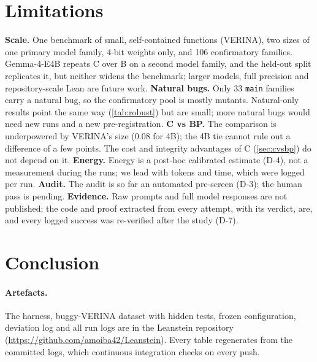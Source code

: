 \documentclass[10pt,twocolumn]{article}
\begin{document}
\section{Limitations}
\label{sec:limits}
\textbf{Scale.} One benchmark of small, self-contained functions (VERINA), two sizes of one primary model family,
4-bit weights only, and 106 confirmatory families. Gemma-4-E4B repeats C over B on a second model family, and the
held-out split replicates it, but neither widens the benchmark; larger models, full precision and
repository-scale Lean are future work.
\textbf{Natural bugs.} Only 33 \texttt{main} families carry a natural bug, so the confirmatory pool is mostly
mutants. Natural-only results point the same way (\cref{tab:robust}) but are small; more natural bugs would need
new runs and a new pre-registration.
\textbf{C vs BP.} The comparison is underpowered by VERINA's size (0.08 for 4B); the 4B tie cannot rule out a
difference of a few points. The cost and integrity advantages of C (\cref{sec:cvsbp}) do not depend on it.
\textbf{Energy.} Energy is a post-hoc calibrated estimate (D-4), not a measurement during the runs; we lead with
tokens and time, which were logged per run.
\textbf{Audit.} The audit is so far an automated pre-screen (D-3); the human pass is pending.
\textbf{Evidence.} Raw prompts and full model responses are not published; the code and proof extracted from
every attempt, with its verdict, are, and every logged success was re-verified after the study (D-7).

\section{Conclusion}
\resConclusionText

\paragraph{Artefacts.} The harness, buggy-VERINA dataset with hidden tests, frozen configuration, deviation log
and all run logs are in the Leanstein repository (\url{https://github.com/amoiba42/Leanstein}). Every
table regenerates from the committed logs, which continuous integration checks on every push.

\FloatBarrier


\end{document}
